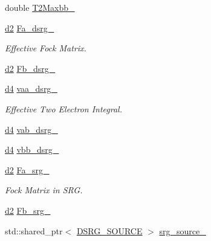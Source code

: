 \begin{DoxyCompactItemize}
\item 
double \mbox{\hyperlink{classforte_1_1_m_c_s_r_g_p_t2___m_o_a78ba6dbb6fc41fe7a965f955e3d350f7}{T2\+Maxbb\+\_\+}}
\item 
\mbox{\hyperlink{mcsrgpt2__mo_8h_ae5de8a172a3b363a852d6d32e6d90537}{d2}} \mbox{\hyperlink{classforte_1_1_m_c_s_r_g_p_t2___m_o_ab2996e176f7a0bb08e4ada76f19bc45d}{Fa\+\_\+dsrg\+\_\+}}
\begin{DoxyCompactList}\small\item\em Effective Fock Matrix. \end{DoxyCompactList}\item 
\mbox{\hyperlink{mcsrgpt2__mo_8h_ae5de8a172a3b363a852d6d32e6d90537}{d2}} \mbox{\hyperlink{classforte_1_1_m_c_s_r_g_p_t2___m_o_a39467f78d8c5061641a4b9dba4ed8211}{Fb\+\_\+dsrg\+\_\+}}
\item 
\mbox{\hyperlink{mcsrgpt2__mo_8h_a0a2245afece5cd37d3b0b6a462927f69}{d4}} \mbox{\hyperlink{classforte_1_1_m_c_s_r_g_p_t2___m_o_a854ca8ec4f26830bb07e4b551bb07894}{vaa\+\_\+dsrg\+\_\+}}
\begin{DoxyCompactList}\small\item\em Effective Two Electron Integral. \end{DoxyCompactList}\item 
\mbox{\hyperlink{mcsrgpt2__mo_8h_a0a2245afece5cd37d3b0b6a462927f69}{d4}} \mbox{\hyperlink{classforte_1_1_m_c_s_r_g_p_t2___m_o_af90db713e40fc4cedb4d1989b7dd5e6a}{vab\+\_\+dsrg\+\_\+}}
\item 
\mbox{\hyperlink{mcsrgpt2__mo_8h_a0a2245afece5cd37d3b0b6a462927f69}{d4}} \mbox{\hyperlink{classforte_1_1_m_c_s_r_g_p_t2___m_o_a1b4e13e78a7c77af85f41166e2725df6}{vbb\+\_\+dsrg\+\_\+}}
\item 
\mbox{\hyperlink{mcsrgpt2__mo_8h_ae5de8a172a3b363a852d6d32e6d90537}{d2}} \mbox{\hyperlink{classforte_1_1_m_c_s_r_g_p_t2___m_o_aeb93e9cba7b31a76f99d58bda4b23867}{Fa\+\_\+srg\+\_\+}}
\begin{DoxyCompactList}\small\item\em Fock Matrix in S\+RG. \end{DoxyCompactList}\item 
\mbox{\hyperlink{mcsrgpt2__mo_8h_ae5de8a172a3b363a852d6d32e6d90537}{d2}} \mbox{\hyperlink{classforte_1_1_m_c_s_r_g_p_t2___m_o_ad03e193596e773f191d0a763f1b3ddad}{Fb\+\_\+srg\+\_\+}}
\item 
std\+::shared\+\_\+ptr$<$ \mbox{\hyperlink{classforte_1_1_d_s_r_g___s_o_u_r_c_e}{D\+S\+R\+G\+\_\+\+S\+O\+U\+R\+CE}} $>$ \mbox{\hyperlink{classforte_1_1_m_c_s_r_g_p_t2___m_o_a0bdb54b9f324182b06da2e1e8902530a}{srg\+\_\+source\+\_\+}}

\end{DoxyCompactItemize}
